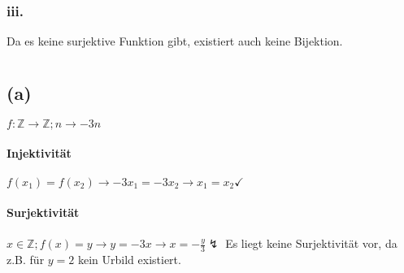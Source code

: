 \documentclass[11pt,a4paper]{article}
\begin{document}
\subsubsection{iii.}
Da es keine surjektive Funktion gibt, existiert auch keine Bijektion.


\section{}

\subsection{(a)}
$f : \mathbb{Z} \rightarrow \mathbb{Z}; n \rightarrow -3n$

\paragraph{Injektivität}
$f(x_1) = f(x_2) \rightarrow -3x_1 = -3x_2 \rightarrow x_1 = x_2 \checkmark$

\paragraph{Surjektivität}
$x \in \mathbb{Z}; f(x) = y \rightarrow y = -3x \rightarrow x = -\frac{y}{3} \lightning$
Es liegt keine Surjektivität vor, da z.B. für $y = 2$ kein Urbild existiert.
\end{document}
